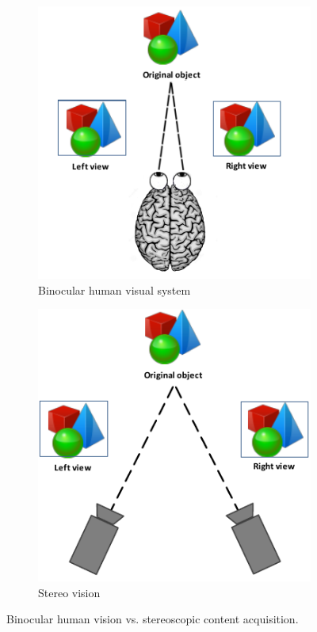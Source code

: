 \begin{figure}[h]
\centering
\begin{subfigure}[b]{0.35\textwidth}
        \includegraphics[width=\textwidth]{./img/hvs.png}
         \caption{\scriptsize{Binocular human visual system}}
         \label{fig:hvs}
\end{subfigure}
\begin{subfigure}[b]{0.35\textwidth}
        \includegraphics[width=\textwidth]{./img/stereo.png}
        \caption{\scriptsize{Stereo vision}}
        \label{fig:stereo}
\end{subfigure} 
\caption{\small{Binocular human vision vs. stereoscopic content acquisition.}}
\end{figure}

